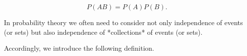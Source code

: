 $$P(AB) = P(A)P(B).$$

In probability theory we often need to consider not only independence of events (or sets) but also independence of *collections* of events (or sets).

Accordingly, we introduce the following definition.
